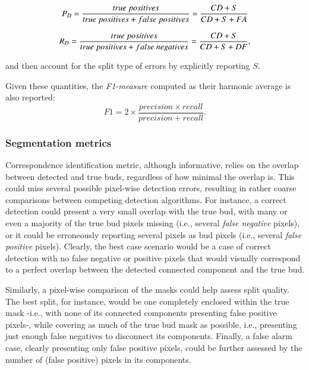 \documentclass[a4paper,authoryear,review]{elsarticle}
\begin{document}
\begin{equation}
    P_D = \frac{true\ positives}{true\ positives+false\ positives} \\
= \frac{CD+S}{CD+S+FA}
    \label{eq:detection-precision}
\end{equation}

\begin{equation}
    R_D = \frac{true\ positives}{true\ positives+false\ negatives} \\
= \frac{CD+S}{CD+S+DF},
    \label{eq:detection-recall}
\end{equation}

and then account for the split type of errors by explicitly reporting $S$. 

Given these quantities, the \emph{F1-measure} computed as their harmonic average is also reported:
\[
    F1 = 2 \times \frac{precision \times recall}{precision + recall}.
\] 

\subsubsection{Segmentation metrics}
\label{subsec:segmetrics}

Correspondence identification metric, although informative, relies on the overlap between detected and true buds, regardless of how minimal the overlap is. This could miss several possible pixel-wise detection errors, resulting in rather coarse comparisons between competing detection algorithms. For instance, a correct detection could present a very small overlap with the true bud, with many or even a majority of the true bud pixels missing (i.e., several \emph{false negative} pixels), or it could be erroneously reporting several pixels as bud pixels (i.e., several \emph{false positive} pixels). Clearly, the best case scenario would be a case of correct detection with no false negative or positive pixels that would visually correspond to a perfect overlap between the detected connected component and the true bud. 

Similarly, a pixel-wise comparison of the masks could help assess split quality. The best split, for instance, would be one completely enclosed within the true mask -i.e., with none of its connected components presenting false positive pixels-, while covering as much of the true bud mask as possible, i.e., presenting just enough false negatives to disconnect its components. Finally, a false alarm case, clearly presenting only false positive pixels, could be further assessed by the number of (false positive) pixels in its components. 
\end{document}
